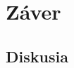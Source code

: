 \documentclass[8pt,twoside,slovak,a4paper]{article}
\begin{document}
\newpage
\section{Záver} \label{zaver} %
\subsection{Diskusia} \label{diskusia}





\end{document}
